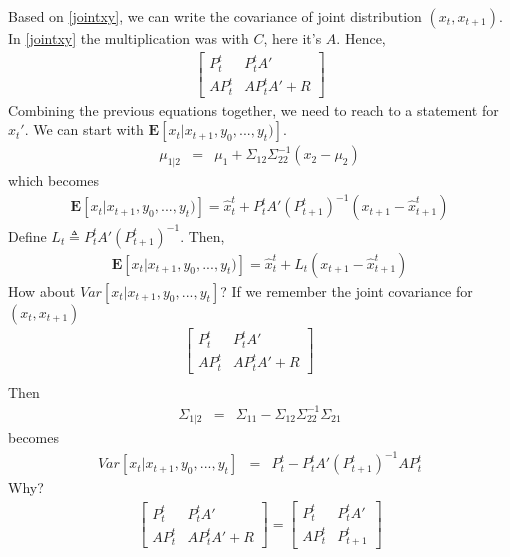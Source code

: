 Based on \eqref{jointxy}, we can write the covariance of joint distribution
$(x_t,x_{t+1})$. In \eqref{jointxy} the multiplication was with $C$, here it's
$A$. Hence,
\begin{eqnarray*}
\left[ \begin{array}{cc}
      P_{t}^t & P_{t}^tA' \\
      AP_{t}^t & AP_{t}^tA'+R
      \end{array} \right]
\end{eqnarray*}
Combining the previous equations together, we need to reach to a statement for
$x_{t}'$. We can start with $\mathbf{E}[x_t|x_{t+1},y_0,...,y_t)]$.
\begin{eqnarray*}
\mu_{1|2} &=& \mu_1 + \Sigma_{12}\Sigma_{22}^{-1}(x_2 - \mu_2)
\end{eqnarray*}
which becomes
\begin{eqnarray*}
\mathbf{E}[x_t|x_{t+1},y_0,...,y_t)] = \hat{x}_{t}^t+P_{t}^tA'(P_{t+1}^t)^{-1}(x_{t+1}-\hat{x}_{t+1}^t)
\end{eqnarray*}
Define $L_t \triangleq P_{t}^tA'(P_{t+1}^t)^{-1}$. Then,
\begin{eqnarray*}
\mathbf{E}[x_t|x_{t+1},y_0,...,y_t)] =
\hat{x}_{t}^t+L_t(x_{t+1}-\hat{x}_{t+1}^t)
\end{eqnarray*}
How about $Var[x_t|x_{t+1},y_0,...,y_t]$? If we remember the joint covariance
for $(x_t,x_{t+1})$
\begin{eqnarray*}
 \left[ \begin{array}{cc} 
      P_{t}^t & P_{t}^tA' \\
      AP_{t}^t & AP_{t}^tA'+R
      \end{array} \right] && \\
\end{eqnarray*}
Then
\begin{eqnarray*}
\Sigma_{1|2} &=& \Sigma_{11}-\Sigma_{12}\Sigma_{22}^{-1}\Sigma_{21}
\end{eqnarray*}
becomes
\begin{eqnarray*}
Var[x_t|x_{t+1},y_0,...,y_t] &=& P_{t}^t - P_{t}^tA'(P_{t+1}^t)^{-1}AP_{t}^t
\end{eqnarray*}
Why?
\begin{eqnarray*}
\left[ \begin{array}{cc}
      P_{t}^t & P_{t}^tA' \\
      AP_{t}^t & AP_{t}^tA'+R
      \end{array} \right]
=      
\left[ \begin{array}{cc}
      P_{t}^t & P_{t}^tA' \\
      AP_{t}^t & P_{t+1}^t
      \end{array} \right]
\end{eqnarray*}
